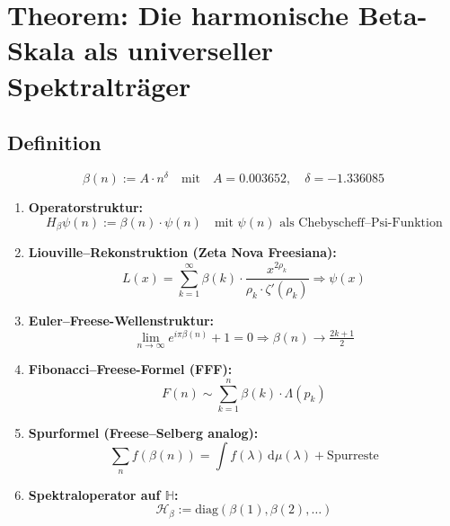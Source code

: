 \documentclass{article}
\begin{document}
\section*{Theorem: Die harmonische Beta-Skala als universeller Spektralträger}

\subsection*{Definition}
\[
\boxed{\beta(n) := A \cdot n^\delta} \quad \text{mit} \quad A = 0.003652, \quad \delta = -1.336085
\]

\begin{enumerate}
    \item \textbf{Operatorstruktur:}
    \[
    H_\beta \psi(n) := \beta(n) \cdot \psi(n)
    \quad \text{mit } \psi(n) \text{ als Chebyscheff–Psi-Funktion}
    \]

    \item \textbf{Liouville–Rekonstruktion (Zeta Nova Freesiana):}
    \[
    L(x) = \sum_{k=1}^\infty \beta(k) \cdot \frac{x^{2\rho_k}}{\rho_k \cdot \zeta'(\rho_k)} \Rightarrow \psi(x)
    \]

    \item \textbf{Euler–Freese-Wellenstruktur:}
    \[
    \lim_{n \to \infty} e^{i\pi \beta(n)} + 1 = 0 \Rightarrow \beta(n) \to \tfrac{2k+1}{2}
    \]

    \item \textbf{Fibonacci–Freese-Formel (FFF):}
    \[
    F(n) \sim \sum_{k=1}^{n} \beta(k) \cdot \Lambda(p_k)
    \]

    \item \textbf{Spurformel (Freese–Selberg analog):}
    \[
    \sum_{n} f(\beta(n)) = \int f(\lambda) \, \mathrm{d}\mu(\lambda) + \text{Spurreste}
    \]

    \item \textbf{Spektraloperator auf \( \mathbb{H} \):}
    \[
    \mathcal{H}_\beta := \text{diag}(\beta(1), \beta(2), \ldots)
    \]
\end{enumerate}
\end{document}
